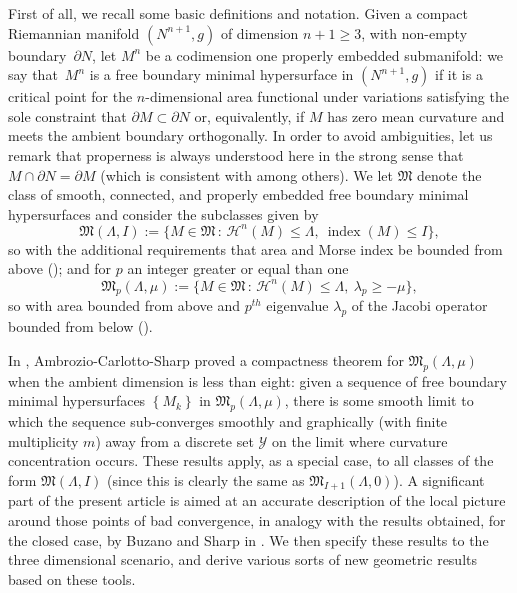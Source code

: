 \documentclass[JEP,XML,SOM,Unicode]{cedram}
\let\mathcal\mathscr
\newcounter{cas}
\newcommand{\sep}{\,:\,}
\DeclareMathOperator{\indx}{index}
\theoremstyle{definition}
\newcommand{\h}{\mathscr{H}}
\begin{document}
First of all, we recall some basic definitions and notation. Given a compact \hbox{Riemannian} manifold $(N^{n+1},g)$ of dimension $n+1\geq 3$, with non-empty boundary~$\partial N$, let $M^n$ be a codimension one properly embedded submanifold: we say that~$M^n$ is a free boundary minimal hypersurface in $(N^{n+1},g)$ if it is a critical point for the $n$-dimensional area functional under variations satisfying the sole constraint that $\partial M\subset\partial N$ or, equivalently, if $M$ has zero mean curvature and meets the ambient boundary orthogonally. In order to avoid ambiguities, let us remark that properness is always understood here in the strong sense that $M \cap \partial N=\partial M$ (which is consistent with \cite{FL14, LZ16B, ACS17, ACS18b} among others).
We let $\mathfrak{M}$ denote the class of smooth, connected, and properly embedded free boundary minimal hypersurfaces and consider the subclasses given by
\[
\mathfrak{M}(\Lambda,I) := \{ M \in \mathfrak{M} \sep \h^n(M) \leq \Lambda,\ \indx(M) \leq I\},
\]
so with the additional requirements that area and Morse index be bounded from above (\cf \cite{Sha15}); and for $p$ an integer greater or equal than one
\[
\mathfrak{M}_p(\Lambda,\mu) := \{ M \in \mathfrak{M} \sep \h^n(M) \leq \Lambda,\ \lambda_p \geq -\mu\},
\]
so with area bounded from above and $p^{th}$ eigenvalue $\lambda_p$ of the Jacobi operator bounded from below (\cf \cite{ACS15}).

In \cite{ACS17}, Ambrozio-Carlotto-Sharp proved a compactness theorem for $\mathfrak{M}_p(\Lambda,\mu)$ when the ambient dimension is less than eight: given a sequence of free boundary minimal hypersurfaces $\left\{M_k\right\}$ in $\mathfrak{M}_p(\Lambda,\mu)$, there is some smooth limit to which the sequence sub-converges smoothly and graphically (with finite multiplicity $m$) away from a discrete set $\mathcal{Y}$ on the limit where curvature concentration occurs. These results apply, as a special case, to all classes of the form $\mathfrak{M}(\Lambda,I)$ (since this is clearly the same as $\mathfrak{M}_{I+1}(\Lambda,0)$).
A significant part of the present article is aimed at an accurate description of the local picture around those points of bad convergence, in analogy with the results obtained, for the closed case, by Buzano and Sharp in \cite{BS17}. We then specify these results to the three dimensional scenario, and derive various sorts of new geometric results based on these tools.
\end{document}
